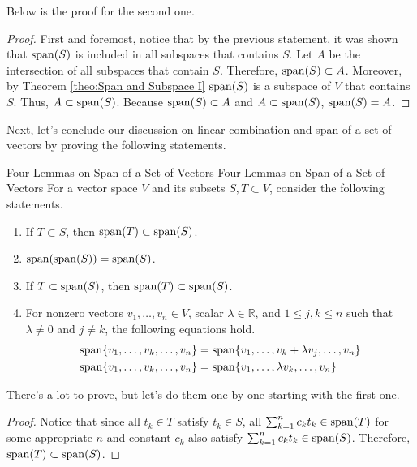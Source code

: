 \documentclass[../main.tex]{subfiles}
\begin{document}
Below is the proof for the second one.

\begin{proof}
First and foremost, notice that by the previous statement, it was
shown that $\operatorname{span}(S)$ is included in all subspaces that contains $S$.
Let $A$ be the intersection of all subspaces that contain $S$.
Therefore, $\operatorname{span}(S) \subset A$. Moreover, by Theorem
\ref{theo:Span and Subspace I} $\operatorname{span}(S)$ is a subspace of $V$ that
contains $S$. Thus, $A \subset \operatorname{span}(S)$. Because $\operatorname{span}(S) \subset A$
and $A \subset \operatorname{span}(S)$, $\operatorname{span}(S) = A$.
\end{proof}

Next, let's conclude our discussion on linear combination and span
of a set of vectors by proving the following statements.

\begin{theorem}{Four Lemmas on Span of a Set of Vectors}
{Four Lemmas on Span of a Set of Vectors}
For a vector space $V$ and its subsets $S, T \subset V$, consider the
following statements.
\begin{enumerate}[noitemsep]
\item If $T \subset S$, then $\operatorname{span}(T) \subset \operatorname{span}(S)$.
\item $\operatorname{span}(\operatorname{span}(S)) = \operatorname{span}(S)$.
\item If $T \subset \operatorname{span}(S)$, then $\operatorname{span}(T) \subset \operatorname{span}(S)$.
\item For nonzero vectors $v_1, \ldots, v_n \in V$, scalar
$\lambda \in \mathbb{R}$, and $1 \leq j, k \leq n$ such that $\lambda
\neq 0$ and $j \neq k$, the following equations hold.
\vspace{-0.5\baselineskip}
\begin{align*}
    \operatorname{span}\{ v_1, \ldots, v_k, \ldots, v_n \}
    &= \operatorname{span}\{ v_1, \ldots, v_k + \lambda v_j, \ldots, v_n \} \\
    \operatorname{span}\{ v_1, \ldots, v_k, \ldots, v_n \}
    &= \operatorname{span}\{ v_1, \ldots, \lambda v_k, \ldots, v_n \}
\end{align*}
\end{enumerate}
\end{theorem}

There's a lot to prove, but let's do them one by one starting with
the first one.

\begin{proof}
Notice that since all $t_k \in T$ satisfy $t_k \in S$, all
$\sum_{k=1}^n c_k t_k \in \operatorname{span}(T)$ for some appropriate $n$ and
constant $c_k$ also satisfy $\sum_{k=1}^n c_k t_k \in \operatorname{span}(S)$.
Therefore, $\operatorname{span}(T) \subset \operatorname{span}(S)$.
\end{proof}
\end{document}
